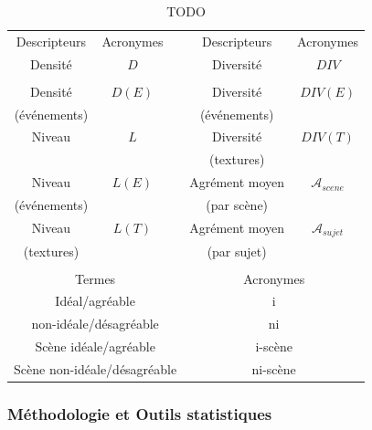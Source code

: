 \begin{table}[t]
\centering
\begin{tabular}{c c c c c} 
Descripteurs          & Acronymes   &   & Descripteurs            & Acronymes  \\                       
\cline{1-2} \cline{4-5}
Densité               & $D$         &   & Diversité               & $DIV$    \\
                      &             &   &                         &          \\
Densité               & $D(E)$      &   & Diversité               & $DIV(E)$ \\
(événements)          &             &   & (événements)            &          \\
Niveau                & $L$         &   & Diversité               & $DIV(T)$ \\
                      &             &   & (textures)              &          \\
Niveau                & $L(E)$      &   & Agrément moyen          & $\mathcal{A}_{scene}$     \\
(événements)          &             &   & (par scène)             &         \\
Niveau                & $L(T)$      &   & Agrément moyen          & $\mathcal{A}_{sujet}$        \\
(textures)            &             &   & (par sujet)             &      \\
                      &             &   &                         &      \\
\multicolumn{3}{c}{Termes} &  \multicolumn{2}{c}{Acronymes} \\ 
\hline
\multicolumn{3}{c}{Idéal/agréable}                 & \multicolumn{2}{c}{i}       \\
\multicolumn{3}{c}{non-idéale/désagréable}         & \multicolumn{2}{c}{ni}      \\
\multicolumn{3}{c}{Scène idéale/agréable}          & \multicolumn{2}{c}{i-scène} \\
\multicolumn{3}{c}{Scène non-idéale/désagréable}   & \multicolumn{2}{c}{ni-scène} \\
\hline
\end{tabular}
\vspace{0.5mm}
\caption{TODO}
\label{tab:acronyme}
\end{table}

\subsubsection{Méthodologie et Outils statistiques}
\label{sec:ch5_methodoEtStat1}

